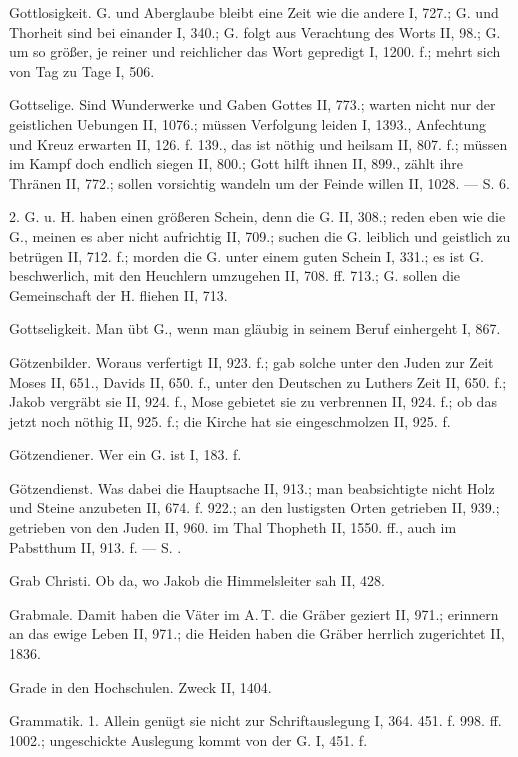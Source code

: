 Gottlosigkeit. G. und Aberglaube bleibt eine Zeit wie die andere I, 727.; G. und Thorheit sind bei einander I, 340.; G. folgt aus Verachtung des Worts II, 98.; G. um so größer, je reiner und reichlicher das Wort gepredigt I, 1200. f.; mehrt sich von Tag zu Tage I, 506.

Gottselige. Sind Wunderwerke und Gaben Gottes II, 773.; warten nicht nur der geistlichen Uebungen II, 1076.; müssen Verfolgung leiden I, 1393., Anfechtung und Kreuz erwarten II, 126. f. 139., das ist nöthig und heilsam II, 807. f.; müssen im Kampf doch endlich siegen II, 800.; Gott hilft ihnen II, 899., zählt ihre Thränen II, 772.; sollen vorsichtig wandeln um der Feinde willen II, 1028. — S.  6.

2. G. u.  H. haben einen größeren Schein, denn die G. II, 308.; reden eben wie die G., meinen es aber nicht aufrichtig II, 709.; suchen die G. leiblich und geistlich zu betrügen II, 712. f.; morden die G. unter einem guten Schein I, 331.; es ist G. beschwerlich, mit den Heuchlern umzugehen II, 708. ff. 713.; G. sollen die Gemeinschaft der H. fliehen II, 713.

Gottseligkeit. Man übt G., wenn man gläubig in seinem Beruf einhergeht I, 867.

Götzenbilder. Woraus verfertigt II, 923. f.; gab solche unter den Juden zur Zeit Moses II, 651., Davids II, 650. f., unter den Deutschen zu Luthers Zeit II, 650. f.; Jakob vergräbt sie II, 924. f., Mose gebietet sie zu verbrennen II, 924. f.; ob das jetzt noch nöthig II, 925. f.; die Kirche hat sie eingeschmolzen II, 925. f.

Götzendiener. Wer ein G. ist I, 183. f.

Götzendienst. Was dabei die Hauptsache II, 913.; man beabsichtigte nicht Holz und Steine anzubeten II, 674. f. 922.; an den lustigsten Orten getrieben II, 939.; getrieben von den Juden II, 960. im Thal Thopheth II, 1550. ff., auch im Pabstthum II, 913. f. — S. .

Grab Christi. Ob da, wo Jakob die Himmelsleiter sah II, 428.

Grabmale. Damit haben die Väter im A.\,T. die Gräber geziert II, 971.; erinnern an das ewige Leben II, 971.; die Heiden haben die Gräber herrlich zugerichtet II, 1836.

Grade in den Hochschulen. Zweck II, 1404.

Grammatik. 1.  Allein genügt sie nicht zur Schriftauslegung I, 364. 451. f. 998. ff. 1002.; ungeschickte Auslegung kommt von der G. I, 451. f.

